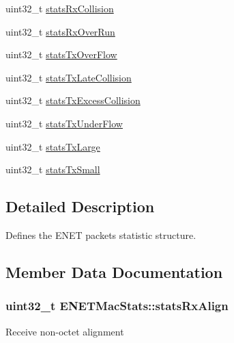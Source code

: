 \begin{DoxyCompactItemize}
\item 
uint32\+\_\+t \hyperlink{structENETMacStats_a3c5b37bd5260d32c643937fa9ae77049}{stats\+Rx\+Collision}
\item 
uint32\+\_\+t \hyperlink{structENETMacStats_a28e89d6333af2dab10d6259c26e095c2}{stats\+Rx\+Over\+Run}
\item 
uint32\+\_\+t \hyperlink{structENETMacStats_a5a92aca891bc5d7e0889b25f2bcaf5d3}{stats\+Tx\+Over\+Flow}
\item 
uint32\+\_\+t \hyperlink{structENETMacStats_a58ac8e39beaa9ef61565b6e4be2c8214}{stats\+Tx\+Late\+Collision}
\item 
uint32\+\_\+t \hyperlink{structENETMacStats_a7c8c30ff4fa88537cd4d60ef17c677d8}{stats\+Tx\+Excess\+Collision}
\item 
uint32\+\_\+t \hyperlink{structENETMacStats_a793f5294811cc167ac88be207029f5fe}{stats\+Tx\+Under\+Flow}
\item 
uint32\+\_\+t \hyperlink{structENETMacStats_ad1ed9420ea656dfecd27d4ba3c4e0316}{stats\+Tx\+Large}
\item 
uint32\+\_\+t \hyperlink{structENETMacStats_a40b5af899138fc64482cf4775e2595fa}{stats\+Tx\+Small}
\end{DoxyCompactItemize}


\subsection{Detailed Description}
Defines the E\+N\+ET packets statistic structure. 

\subsection{Member Data Documentation}
\subsubsection[{\texorpdfstring{stats\+Rx\+Align}{statsRxAlign}}]{\setlength{\rightskip}{0pt plus 5cm}uint32\+\_\+t E\+N\+E\+T\+Mac\+Stats\+::stats\+Rx\+Align}\hypertarget{structENETMacStats_ac66ba521e708361cdd249a2e55589fc0}{}\label{structENETMacStats_ac66ba521e708361cdd249a2e55589fc0}
Receive non-\/octet alignment 
